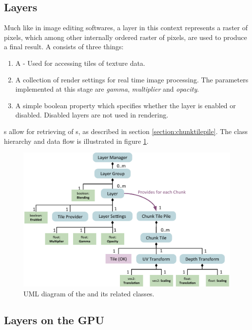 \subsection{Layers}
Much like in image editing softwares, a layer in this context represents a raster of pixels, which among other internally ordered raster of pixels, are used to produce a final result. A  consists of three things:

\begin{enumerate}
\item A  - Used for accessing tiles of texture data.
\item A collection of render settings for real time image processing. The parameters implemented at this stage are \emph{gamma}, \emph{multiplier} and \emph{opacity}.
\item A simple boolean property which specifies whether the layer is enabled or disabled. Disabled layers are not used in rendering.
\end{enumerate}

s allow for retrieving of s, as described in section \ref{section:chunktilepile}. The class hierarchy and data flow is illustrated in figure \ref{fig:layermanager}.

\begin{figure}[htbp]
    \centering
    \includegraphics[width=\textwidth]{figures/implementation/layers/layermanager.pdf}
    \caption{UML diagram of the  and its related classes.}
    \label{fig:layermanager}
\end{figure}

\subsection{Layers on the GPU}

